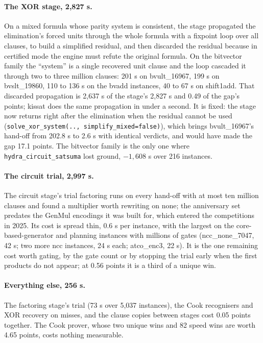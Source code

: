 \documentclass[10pt]{article}
\newcommand{\hcs}{\texttt{hydra\_circuit\_satsuma}}
\begin{document}
\paragraph{The XOR stage, 2,827 s.} On a mixed formula whose parity
system is consistent, the stage propagated the elimination's forced units
through the whole formula with a fixpoint loop over all clauses, to build
a simplified residual, and then discarded the residual because in
certified mode the engine must refute the original formula. On the
bitvector family the ``system'' is a single recovered unit clause and the
loop cascaded it through two to three million clauses: 201 s on
bvult\_16967, 199 s on bvslt\_19860, 110 to 136 s on the bvadd instances,
40 to 67 s on shift1add. That discarded propagation is 2,637 s of the
stage's 2,827 s and 0.49 of the gap's points; kissat does the same
propagation in under a second. It is fixed: the stage now returns right
after the elimination when the residual cannot be used
(\texttt{solve\_xor\_system(.., simplify\_mixed=false)}), which brings
bvult\_16967's hand-off from 202.8 s to 2.6 s with identical verdicts, and
would have made the gap 17.1 points. The bitvector family is the only one
where \hcs{} lost ground, $-1{,}608$ s over 216 instances.

\paragraph{The circuit trial, 2,997 s.} The circuit stage's trial
factoring runs on every hand-off with at most ten million clauses and
found a multiplier worth rewriting on none; the anniversary set predates
the GenMul encodings it was built for, which entered the competitions in
2025. Its cost is spread thin, 0.6 s per instance, with the largest on the
core-based-generator and planning instances with millions of gates
(ncc\_none\_7047, 42 s; two more ncc instances, 24 s each; atco\_enc3, 22 s).
It is the one remaining cost worth gating, by the gate count or by
stopping the trial early when the first products do not appear; at
0.56 points it is a third of a unique win.

\paragraph{Everything else, 256 s.} The factoring stage's trial (73 s over
5,037 instances), the Cook recognisers and XOR recovery on misses, and the
clause copies between stages cost 0.05 points together. The Cook prover,
whose two unique wins and 82 speed wins are worth 4.65 points, costs
nothing measurable.
\end{document}

